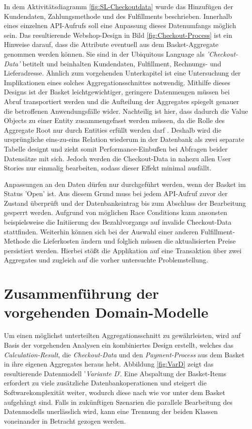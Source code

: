 In dem Aktivitätsdiagramm \ref{fig:SL-Checkoutdata} wurde das Hinzufügen der Kundendaten, Zahlungsmethode und des Fulfillments beschrieben. Innerhalb eines einzelnen API-Aufrufs soll eine Anpassung dieses Datenumfangs möglich sein. Das resultierende Webshop-Design in Bild \ref{fig:Checkout-Process} ist ein Hinweise darauf, dass die Attribute eventuell aus dem Basket-Aggregate genommen werden können. Sie sind in der Ubiquitous Language als \emph{'Checkout-Data'} betitelt und beinhalten Kundendaten, Fulfillment, Rechnungs- und Lieferadresse. Ähnlich zum vorgehenden Unterkapitel ist eine Untersuchung der Implikationen eines solches Aggregationsschnittes notwendig. Mithilfe dieses Designs ist der Basket leichtgewichtiger, geringere Datenmengen müssen bei Abruf transportiert werden und die Aufteilung der Aggregates spiegelt genauer die betroffenen Anwendungsfälle wider. Nachteilig ist hier, dass dadurch die Value Objects zu einer Entity zusammengefasst werden müssen, da die Rolle des Aggregate Root nur durch Entities erfüllt werden darf \cite[S. 129]{Evans.2011}. Deshalb wird die ursprüngliche eins-zu-eins Relation wiederum in der Datenbank als zwei separate Tabelle designt und zieht somit Performance-Einbußen bei Abfragen beider Datensätze mit sich. Jedoch werden die Checkout-Data in nahezu allen User Stories nur einmalig bearbeiten, sodass dieser Effekt minimal ausfällt. 

Anpassungen an den Daten dürfen nur durchgeführt werden, wenn der Basket im Status 'Open' ist. Aus diesem Grund muss bei jedem API-Aufruf zuvor der Zustand überprüft und der Datenbankeintrag bis zum Abschluss der Bearbeitung gesperrt werden. Aufgrund von möglichen Race Conditions kann ansonsten beispielsweise die Initiierung des Bezahlvorgangs auf invalide Checkout-Data stattfinden. Weiterhin können sich bei der Auswahl einer anderen Fulfillment-Methode die Lieferkosten ändern und folglich müssen die aktualisierten Preise persistiert werden. Hierbei stößt die Applikation auf eine Transaktion über zwei Aggregates und zugleich auf die vorher untersuchte Problemstellung.


\section{Zusammenführung der vorgehenden Domain-Modelle}

Um einen möglichst unterteilten Aggregationsschnitt zu gewährleisten, wird auf Basis der vorgehenden Analysen ein kombiniertes Design erstellt, welches das \emph{Calculation-Result}, die \emph{Checkout-Data} und den \emph{Payment-Process} aus dem Basket in ihre eigenen Aggregates heraus hebt. Abbildung \ref{fig:VarD} zeigt das resultierende Datenmodell '\emph{Variante D}'. Eine Abspaltung der Basket-Items erfordert zu viele zusätzliche Datenbankoperationen und steigert die Softwarekomplexität weiter, wodurch diese nach wie vor unter dem Basket aufgehängt sind. Falls in zukünftigen Szenarien die parallele Bearbeitung des Datenmodells unerlässlich wird, kann eine Trennung der beiden Klassen voneinander in Betracht gezogen werden.  

